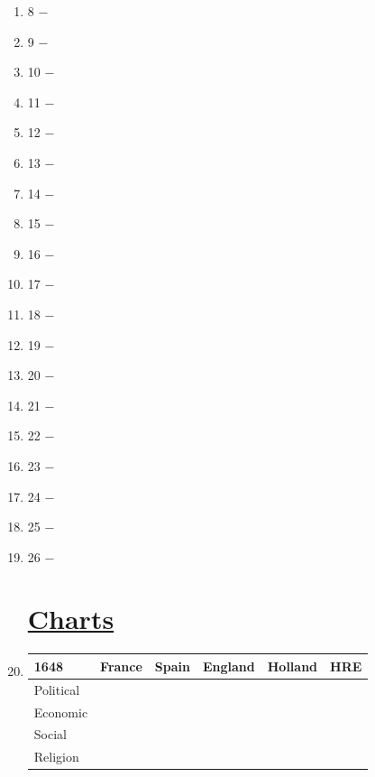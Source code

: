 \documentclass[12pt]{article}
\begin{document}
\begin{enumerate}
\item 8 $-$ 

\item 9 $-$ 

\item 10 $-$ 

\item 11 $-$ 

\item 12 $-$ 

\item 13 $-$ 

\item 14 $-$ 

\item 15 $-$

\item 16 $-$ 

\item 17 $-$ 

\item 18 $-$ 

\item 19 $-$ 

\item 20 $-$ 

\item 21 $-$ 

\item 22 $-$ 

\item 23 $-$ 

\item 24 $-$ 

\item 25 $-$ 

\item 26 $-$ 

\section{\underline{Charts}}

\item \begin{tabular}{|l|l|l|l|l|l|}

\hline
1648 & France & Spain & England & Holland & HRE \\
\hline
Political & & & & & \\
\hline
Economic & & & & & \\
\hline
Social & & & & & \\
\hline
Religion & & & & & \\
\hline



\end{tabular}
\end{enumerate}
\end{document}
